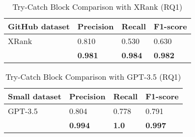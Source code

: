 \begin{table}[t]%
  \caption{Try-Catch Block Comparison with XRank (RQ1)}
  \vspace{-12pt}
  \small
	\begin{center}
		\renewcommand{\arraystretch}{1}
		\begin{tabular}{| p{3.05cm}<{\centering} | p{1.2cm}<{\centering} | p{1.2cm}<{\centering}| p{1.2cm}<{\centering}|}
		  \hline
			GitHub dataset  & Precision  &  Recall & F1-score \\
			\hline
			\hline
			XRank & 0.810 & 0.530 & 0.630\\
			\hline
			\tool   &  \textbf{0.981} &  {\bf 0.984} & \textbf{0.982}\\
			\hline
		\end{tabular}
		\label{tab:xblock-1}
	\end{center}
\end{table}

\begin{table}[t]%
  \caption{Try-Catch Block Comparison with GPT-3.5 (RQ1)}
  \vspace{-12pt}
  \small
	\begin{center}
		\renewcommand{\arraystretch}{1}
		\begin{tabular}{| p{1.85cm}<{\centering} | p{1.6cm}<{\centering} | p{1.6cm}<{\centering}| p{1.6cm}<{\centering}|}
		  \hline
		Small dataset	  & Precision  &  Recall & F1-score \\
			\hline
                        GPT-3.5  & 0.804  & 0.778   & 0.791\\
			\hline
			\tool   &  \textbf{0.994} &  {\bf 1.0} & \textbf{0.997}\\
			\hline
		\end{tabular}
		\label{tab:xblock-2}
	\end{center}
\end{table}





